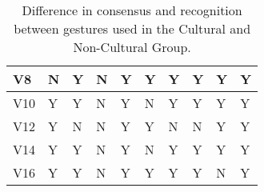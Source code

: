 \begin{table}[ht]
\begin{tabular}{|l|l|l|l|l|l|l|l|l|l|}
    V8 & \cellcolor[HTML]{FFE7E6}N & Y & \cellcolor[HTML]{FFE7E6}N & Y & Y & Y & Y & Y & Y \\ \hline
    V10 & Y & Y & \cellcolor[HTML]{FFE7E6}N & Y & \cellcolor[HTML]{FFE7E6}N & Y & Y & Y & Y \\ \hline
    V12 & Y & \cellcolor[HTML]{FFE7E6}N & \cellcolor[HTML]{FFE7E6}N & Y & Y & \cellcolor[HTML]{FFE7E6}N & \cellcolor[HTML]{FFE7E6}N & Y & Y \\ \hline
    V14 & Y & Y & \cellcolor[HTML]{FFE7E6}N & Y & \cellcolor[HTML]{FFE7E6}N & Y & Y & Y & Y \\ \hline
    V16 & Y & Y & \cellcolor[HTML]{FFE7E6}N & Y & Y & Y & Y & \cellcolor[HTML]{FFE7E6}N & Y \\ \hline
    \end{tabular}
    \caption{\label{tab:Table_GestureVerification}Difference in consensus and recognition between gestures used in the Cultural and Non-Cultural Group.}
    \end{table}


